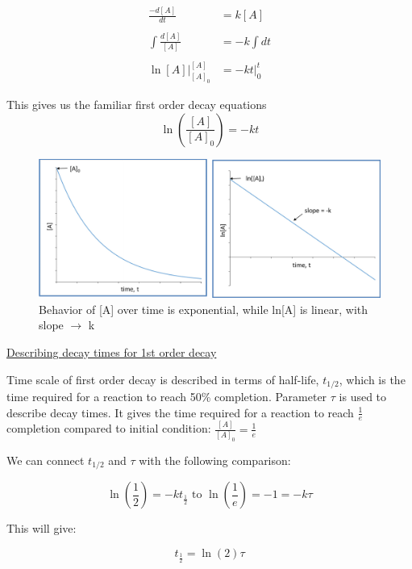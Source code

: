 \documentclass[12pt, letterpaper]{article}
\begin{document}
    \begin{align*}
        \frac{-d[A]}{dt} &= k[A] \\ \\
        \int \frac{d[A]}{[A]} &= -k \int dt \\ \\
        \ln[A] |_{[A]_0} ^{[A]} &= -\left.k t\right|_0 ^t 
    \end{align*}

    This gives us the familiar first order decay equations
    \begin{equation}
        \ln(\frac{[A]}{[A]_0}) = -kt
    \end{equation}

    \begin{figure}[h]
        \includegraphics[scale = 0.6]{Reaction Rates.png}
        \caption{Behavior of [A] over time is exponential, while ln[A] is linear, with slope $\rightarrow$ k}
    \end{figure} 
    
    \underline{Describing decay times for 1st order decay}

    Time scale of first order decay is described in terms of half-life, $t_{1/2}$, which is the time required for a reaction to reach 50\% completion. 
    Parameter $\tau$ is used to describe decay times. It gives the time required for a reaction to reach $\frac{1}{e}$ completion compared to initial 
    condition: \( \frac{[A]}{[A]_0} = \frac{1}{e} \)

    \newpage

    We can connect $t_{1/2}$ and $\tau$ with the following comparison: 

    \begin{equation}
        \ln(\frac{1}{2})  = -kt_{\frac{1}{2}} \text{ to } \ln(\frac{1}{e}) = -1 = -k\tau
    \end{equation}

    This will give:

    \begin{equation}
        t_{\frac{1}{2}} = \ln(2) \tau
    \end{equation}
\end{document}
